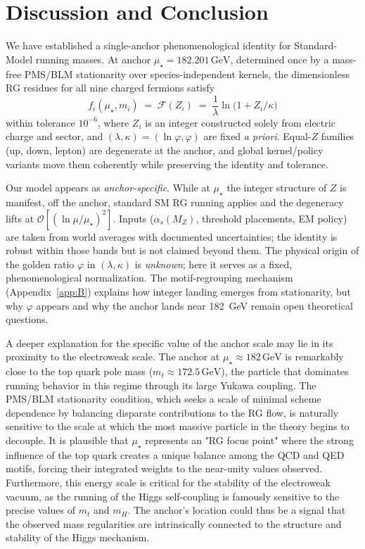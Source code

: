 \documentclass[aps,prd,onecolumn,amsmath,amssymb,superscriptaddress,nofootinbib,showpacs,showkeys]{revtex4-2}
\begin{document}
\section{Discussion and Conclusion}\label{sec:discussion}

We have established a single-anchor phenomenological identity for Standard-Model running masses. At anchor $\mu_\star=182.201\,\mathrm{GeV}$, determined once by a mass-free PMS/BLM stationarity over species-independent kernels, the dimensionless RG residues for all nine charged fermions satisfy
\[
f_i(\mu_\star,m_i)\;=\;\mathcal F(Z_i)\;=\;\frac{1}{\lambda}\ln\!\bigl(1+Z_i/\kappa\bigr)
\]
within tolerance $10^{-6}$, where $Z_i$ is an integer constructed solely from electric charge and sector, and $(\lambda,\kappa)=(\ln\varphi,\varphi)$ are fixed \emph{a priori}. Equal-$Z$ families (up, down, lepton) are degenerate at the anchor, and global kernel/policy variants move them coherently while preserving the identity and tolerance.

Our model appears as  \emph{anchor-specific}. While  at $\mu_\star$ the integer structure of $Z$
is manifest,  off the anchor, standard SM RG running applies and the degeneracy lifts
at $\mathcal{O}[(\ln\mu/\mu_\star)^2]$. Inputs ($\alpha_s(M_Z)$, threshold placements, EM policy) are taken from world averages with documented uncertainties; the identity is robust within those bands but is not claimed beyond them. The physical origin of the golden ratio $\varphi$ in $(\lambda,\kappa)$ is \emph{unknown}; here it serves as a fixed, phenomenological normalization. The motif-regrouping mechanism (Appendix~\ref{app:B}) explains how integer landing emerges from stationarity, but why $\varphi$ appears and why the anchor lands near 182~GeV remain open theoretical questions. 

 A deeper explanation for the specific value of the anchor scale may lie in its proximity to the electroweak scale. The anchor at $\mu_\star\approx182\,\mathrm{GeV}$ is remarkably close to the top quark pole mass ($m_t \approx 172.5\,\mathrm{GeV}$), the particle that dominates running behavior in this regime through its large Yukawa coupling. The PMS/BLM stationarity condition, which seeks a scale of minimal scheme dependence by balancing disparate contributions to the RG flow, is naturally sensitive to the scale at which the most massive particle in the theory begins to decouple. It is plausible that $\mu_\star$ represents an "RG focus point" where the strong influence of the top quark creates a unique balance among the QCD and QED motifs, forcing their integrated weights to the near-unity values observed. Furthermore, this energy scale is critical for the stability of the electroweak vacuum, as the running of the Higgs self-coupling is famously sensitive to the precise values of $m_t$ and $m_H$. The anchor's location could thus be a signal that the observed mass regularities are intrinsically connected to the structure and stability of the Higgs mechanism.
\end{document}

